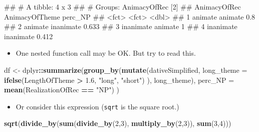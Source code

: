 \documentclass[
]{book}
\newenvironment{Shaded}{\begin{snugshade}}{\end{snugshade}}
\newcommand{\AttributeTok}[1]{\textcolor[rgb]{0.13,0.29,0.53}{#1}}
\newcommand{\DecValTok}[1]{\textcolor[rgb]{0.00,0.00,0.81}{#1}}
\newcommand{\FloatTok}[1]{\textcolor[rgb]{0.00,0.00,0.81}{#1}}
\newcommand{\FunctionTok}[1]{\textcolor[rgb]{0.13,0.29,0.53}{\textbf{#1}}}
\newcommand{\NormalTok}[1]{#1}
\newcommand{\OtherTok}[1]{\textcolor[rgb]{0.56,0.35,0.01}{#1}}
\newcommand{\SpecialCharTok}[1]{\textcolor[rgb]{0.81,0.36,0.00}{\textbf{#1}}}
\newcommand{\StringTok}[1]{\textcolor[rgb]{0.31,0.60,0.02}{#1}}
\providecommand{\tightlist}{%
  \setlength{\itemsep}{0pt}\setlength{\parskip}{0pt}}
\begin{document}
\begin{Shaded}
\begin{Highlighting}[]
\NormalTok{\#\# \# A tibble: 4 x 3}
\NormalTok{\#\# \# Groups:   AnimacyOfRec [2]}
\NormalTok{\#\#   AnimacyOfRec AnimacyOfTheme perc\_NP}
\NormalTok{\#\#   \textless{}fct\textgreater{}        \textless{}fct\textgreater{}            \textless{}dbl\textgreater{}}
\NormalTok{\#\# 1 animate      animate          0.8  }
\NormalTok{\#\# 2 animate      inanimate        0.633}
\NormalTok{\#\# 3 inanimate    animate          1    }
\NormalTok{\#\# 4 inanimate    inanimate        0.412}
\end{Highlighting}
\end{Shaded}

\begin{itemize}
\tightlist
\item
  One nested function call may be OK. But try to read this.
\end{itemize}

\begin{Shaded}
\begin{Highlighting}[]
\NormalTok{df }\OtherTok{\textless{}{-}}\NormalTok{ dplyr}\SpecialCharTok{::}\FunctionTok{summarize}\NormalTok{(}\FunctionTok{group\_by}\NormalTok{(}\FunctionTok{mutate}\NormalTok{(dativeSimplified, }\AttributeTok{long\_theme =} \FunctionTok{ifelse}\NormalTok{(LengthOfTheme }\SpecialCharTok{\textgreater{}} \FloatTok{1.6}\NormalTok{, }\StringTok{"long"}\NormalTok{, }\StringTok{"short"}\NormalTok{) ), long\_theme),}
              \AttributeTok{perc\_NP =} \FunctionTok{mean}\NormalTok{(RealizationOfRec }\SpecialCharTok{==} \StringTok{"NP"}\NormalTok{)}
\NormalTok{              )}
\end{Highlighting}
\end{Shaded}

\begin{itemize}
\tightlist
\item
  Or consider this expression (\texttt{sqrt} is the square root.)
\end{itemize}

\begin{Shaded}
\begin{Highlighting}[]
\FunctionTok{sqrt}\NormalTok{(}\FunctionTok{divide\_by}\NormalTok{(}\FunctionTok{sum}\NormalTok{(}\FunctionTok{divide\_by}\NormalTok{(}\DecValTok{2}\NormalTok{,}\DecValTok{3}\NormalTok{), }\FunctionTok{multiply\_by}\NormalTok{(}\DecValTok{2}\NormalTok{,}\DecValTok{3}\NormalTok{)), }\FunctionTok{sum}\NormalTok{(}\DecValTok{3}\NormalTok{,}\DecValTok{4}\NormalTok{)))}
\end{Highlighting}
\end{Shaded}
\end{document}
